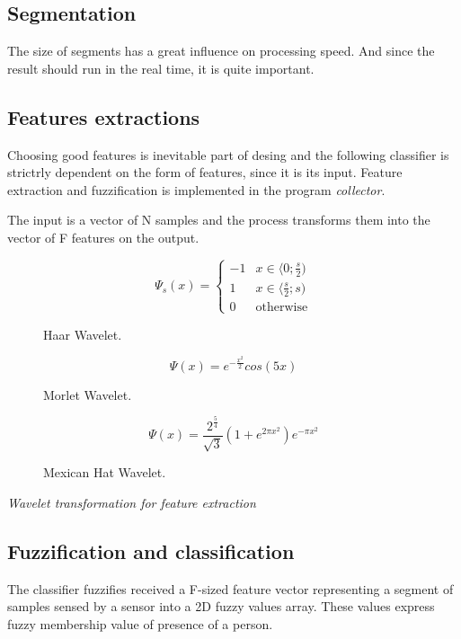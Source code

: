 \subsection*{Segmentation}
The size of segments has a great influence on processing speed. And since the
result should run in the real time, it is quite important.

\subsection*{Features extractions}
Choosing good features is inevitable part of desing and the following classifier
is strictrly dependent on the form of features, since it is its input. Feature extraction
and fuzzification is implemented in the program {\it collector}.

The input is a vector of N samples and the process transforms them into the vector of
F features on the output.

\begin{figure}[!ht]
\begin{equation}
\Psi_s(x) = \begin{cases}
-1    & x \in \langle 0 ; \frac{s}{2} ) \\ 
1     & x \in \langle \frac{s}{2} ; s ) \\
0     & \text{otherwise}
\end{cases}
\end{equation}
\caption{Haar Wavelet.}
\end{figure}

\begin{figure}[!ht]
\begin{equation}
\Psi(x) = e^{-\frac{x^2}{2}} cos(5x)
\end{equation}
\caption{Morlet Wavelet.}
\end{figure}

\begin{figure}[!ht]
\begin{equation}
\Psi(x) = \frac{2^{\frac{5}{4}}}{\sqrt{3}}(1 + e^{2\pi x^2})e^{-\pi x^2}
\end{equation}
\caption{Mexican Hat Wavelet.}
\end{figure}

{\it Wavelet transformation for feature extraction}

\subsection*{Fuzzification and classification}
The classifier fuzzifies received a F-sized feature vector representing a segment of samples sensed by a sensor
into a 2D fuzzy values array. These values express fuzzy membership value of presence of a person.

